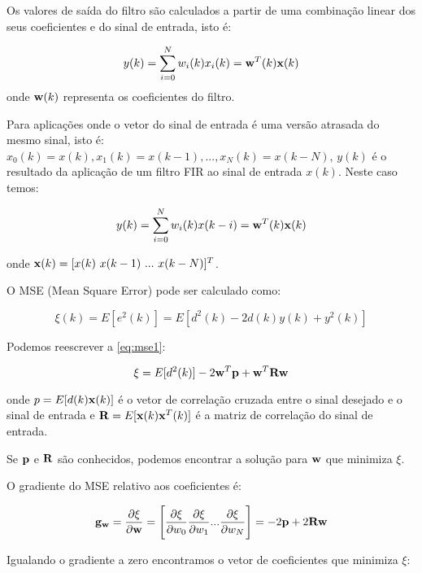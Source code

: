 Os valores de saída do filtro são calculados a partir de uma combinação linear dos seus coeficientes e do sinal de entrada, isto é:

\begin{equation}\label{eq:y}
y(k) = \sum_{i=0}^{N} w_i(k) x_i(k) = {\bf w}^T(k) {\bf x}(k)
\end{equation}
onde ${\bf w}(k)$ representa os coeficientes do filtro.

Para aplicações onde o vetor do sinal de entrada é uma versão atrasada do mesmo sinal, isto é: $x_0(k) = x(k),x_1(k) = x(k - 1),...,x_N(k) = x(k - N)$, $y(k)$ é o resultado da aplicação de um filtro FIR ao sinal de entrada $x(k)$. Neste caso temos:

\begin{equation}
y(k) = \sum_{i=0}^{N} w_i(k) x(k-i) = {\bf w}^T(k) {\bf x}(k)
\end{equation}

onde ${\bf x}(k) = [x(k) \ x(k-1) \ ... \ x(k - N)]^T$.

O  MSE (Mean Square Error) pode ser calculado como:

\begin{equation} \label{eq:mse1}
\xi(k) = E[e^2(k)] = E[d^2(k) - 2d(k)y(k) + y^2(k)]
\end{equation}

Podemos reescrever a \cref{eq:mse1}:

\begin{equation}\label{eq:mse2}
\xi = E[d^2(k)] - 2{\bf w}^T{\bf p} + {\bf w}^T {\bf Rw}
\end{equation}

onde $p = E[d(k){\bf x}(k)]$ é o vetor de correlação cruzada entre o sinal desejado e o sinal de entrada e ${\bf R} = E[{\bf x}(k){\bf x}^T(k)]$ é a matriz de correlação do sinal de entrada.

Se ${\bf p}$ e ${\bf R}$ são conhecidos, podemos encontrar a solução para ${\bf w}$ que minimiza $\xi$.

O gradiente do MSE relativo aos coeficientes é:

\begin{equation}
{\bf g_w} = \frac{\partial \xi}{\partial {\bf w}} = 
\Bigg[\frac{\partial \xi}{\partial {w_0}}
\frac{\partial \xi}{\partial {w_1}} ...
\frac{\partial \xi}{\partial {w_N}}
\Bigg] = -2{\bf p} + 2{\bf Rw}
\end{equation}

Igualando o gradiente a zero encontramos o vetor de coeficientes que minimiza $\xi$:


